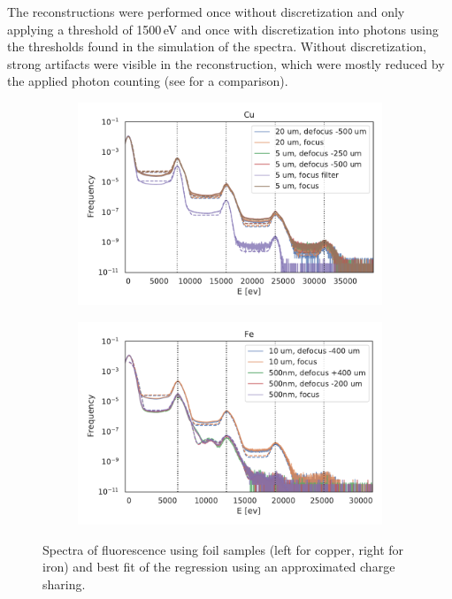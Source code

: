 The reconstructions were performed once without discretization and only applying a threshold of 1500\,eV and once with discretization into photons using the thresholds found in the simulation of the spectra. Without discretization, strong artifacts were visible in the reconstruction, which were mostly reduced by the applied photon counting (see  for a comparison).

\begin{figure}
	\centering
	\begin{subfigure}[b]{0.45\textwidth}
		\includegraphics[width=\linewidth]{images/spectrum_foil_cu.pdf}
	\end{subfigure}
	\begin{subfigure}[b]{0.45\textwidth}
		\includegraphics[width=\linewidth]{images/spectrum_foil_fe.pdf}
	\end{subfigure}
	\caption[Spectra of fluorescence using foil samples ]{Spectra of fluorescence using foil samples (left for copper, right for iron) and best fit of the regression using an approximated charge sharing.}
	\label{fig:spectrafoil}
\end{figure}


